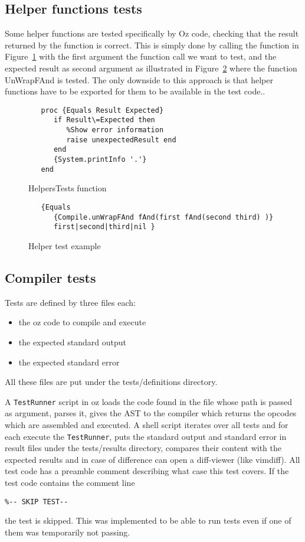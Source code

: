 \documentclass[a4paper]{memoir}
\begin{document}
\subsection{Helper functions tests}
Some helper functions are tested specifically by Oz code, checking that the result returned by the function is correct. This is simply done by calling the function in Figure~\ref{fig:helperstestsfunction} with the first argument the function call we want to test, and the expected result as second argument as illustrated in Figure~\ref{fig:helperstestsexample} where the function UnWrapFAnd is tested.
The only downside to this approach is that helper functions have to be exported for them to be available in the test code..

\begin{figure}
\begin{lstlisting}
   proc {Equals Result Expected}
      if Result\=Expected then
         %Show error information
         raise unexpectedResult end
      end
      {System.printInfo '.'}
   end
\end{lstlisting}
\label{fig:helperstestsfunction}
\caption{HelpersTests function}
\end{figure}

\begin{figure}
\begin{lstlisting}
   {Equals 
      {Compile.unWrapFAnd fAnd(first fAnd(second third) )}
      first|second|third|nil }
\end{lstlisting}
\caption{Helper test example}
\label{fig:helperstestsexample}
\end{figure}
\subsection{Compiler tests}
Tests are defined by three files each:
\begin{itemize}
  \item the oz code to compile and execute
  \item the expected standard output
  \item the expected standard error
\end{itemize}
All these files are put under the tests/definitions directory.

A \lstinline!TestRunner! script in oz loads the code found in the file whose path is passed as argument, parses it, gives the AST to the compiler which returns the opcodes which are assembled and executed. 
A shell script iterates over all tests and for each execute the
\lstinline!TestRunner!, puts the standard output and standard error in result
files under the tests/results directory, compares their content with the
expected results and in case of difference can open a diff-viewer (like vimdiff).
All test code has a preamble comment describing what case this test covers.
If the test code contains the comment line
\begin{lstlisting}
%-- SKIP TEST-- 
\end{lstlisting}
the test is skipped. This was implemented to be able to run tests even if one of them was temporarily not passing.
\end{document}
